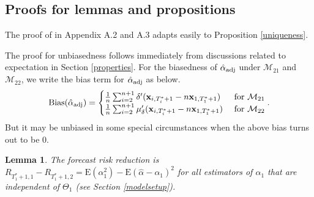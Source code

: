 \documentclass[11pt,3p,review,authoryear]{elsarticle}
\def\mbf#1{\mathbf{#1}} %
\def\mrm#1{\mathrm{#1}} %
\def\mc#1{\mathcal{#1}} %
\def\E#1{\mathrm{E}(#1)} %
\newtheorem{lem}{Lemma}
\theoremstyle{definition}
\newenvironment{proof-of-proposition}[1][{}]{\noindent{\bf
    Proof of Proposition {#1}}
  \hspace*{.5em}}{\qed\bigskip\\}
\begin{document}
\subsection{Proofs for lemmas and propositions}

\begin{proof-of-proposition}[\ref{uniqueness}]
  The proof of \citet{li2019statistical} in Appendix A.2 and A.3 adapts easily to Proposition \ref{uniqueness}.
\end{proof-of-proposition}


\begin{proof-of-proposition}[\ref{unbiased}] The proof for unbiasedness follows immediately from discussions related to expectation in Section \ref{properties}. For the biasedness of  $\hat{\alpha}_{\rm adj}$ under $\mc{M}_{21}$ and $\mc{M}_{22}$, we write the bias term for $\hat{\alpha}_{\rm adj}$ as below.
\begin{align*}
  \mrm{Bias}(\hat{\alpha}_{\rm adj}) = 
  \begin{cases}
       \frac{1}{n} \sum_{i=2}^{n+1} \delta'(\mbf{x}_{i, T_i^*+1}-n\mbf{x}_{1, T_1^*+1})  & \text{ for } \mc{M}_{21}\\
    \frac{1}{n} \sum_{i=2}^{n+1} \mu_{\delta}'(\mbf{x}_{i, T_i^*+1}-n\mbf{x}_{1, T_1^*+1})  & \text{ for }\mc{M}_{22}
  \end{cases}.
\end{align*}
But it may be unbiased in some special circumstances when the above bias turns out to be 0. \end{proof-of-proposition}

\begin{lem}
  \label{risklemma} The forecast risk reduction is $R_{T_1^*+1,1}-R_{T_1^*+1,2}=\E{\alpha_1^2}-\E{\hat{\alpha}-\alpha_1}^2$ for all estimators of $\alpha_1$ that are independent of $\Theta_1$ (see Section \ref{modelsetup}).
\end{lem}
\end{document}
